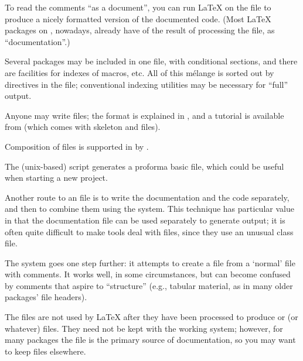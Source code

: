 To read the comments ``as a document'', you can run \LaTeX{} on the
 file to produce a nicely formatted version of the
documented code.  (Most \LaTeX{} packages on \ctan{}, nowadays, already
have  of the result of processing the  file,
as ``documentation''.)

Several packages may be included in one  file, with
conditional sections, and there are facilities for indexes of macros,
etc.  All of this m\'elange is sorted out by directives in the
 file; conventional indexing utilities may be necessary
for ``full'' output.

Anyone may write  files; the format is explained in
, and a tutorial is available
from  (which comes with skeleton  and
 files).

Composition of  files is supported in  by
.

The (unix-based) script  generates a proforma basic
 file, which could be useful when starting a new
project.

Another route to an  file is to write the
documentation and the code separately, and then to combine them using
the  system.  This technique has particular value in
that the documentation file can be used separately to generate
 output; it is often quite difficult to make %
 tools deal
with  files, since they use an unusual class file.

The  system goes one step further: it attempts to
create a  file from a `normal'  file
with comments.  It works well, in some circumstances, but can become
confused by comments that aspire to ``structure'' (e.g., tabular
material, as in many older packages' file headers).

The  files are not used by \LaTeX{} after they have been
processed to produce  or  (or whatever)
files.  They need not be kept with the working system; however, for
many packages the  file is the primary source of
documentation, so you may want to keep  files elsewhere.

